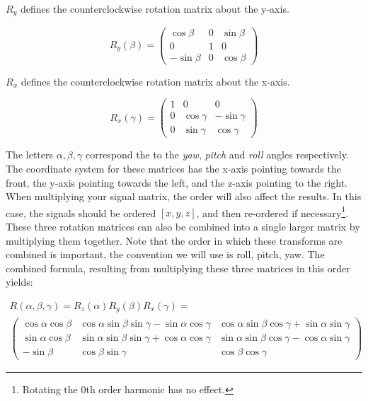 $R_y$ defines the counterclockwise rotation matrix about the y-axis.

\begin{equation}
R_{y}(\beta)=\left(\begin{array}{ccc}
\cos \beta & 0 & \sin \beta \\
0 & 1 & 0 \\
-\sin \beta & 0 & \cos \beta
\end{array}\right)
\end{equation}

$R_x$ defines the counterclockwise rotation matrix about the x-axis.

\begin{equation}
R_{x}(\gamma)=\left(\begin{array}{ccc}
1 & 0 & 0 \\
0 & \cos \gamma & -\sin \gamma \\
0 & \sin \gamma & \cos \gamma
\end{array}\right)
\end{equation}

The letters $\alpha, \beta, \gamma$ correspond the to the \textit{yaw}, \textit{pitch} and \textit{roll} angles respectively. The coordinate system for these matrices has the x-axis pointing towards the front, the y-axis pointing towards the left, and the z-axis pointing to the right. When multiplying your signal matrix, the order will also affect the results. In this case, the signals should be ordered $[x, y, z]$, and then re-ordered if necessary\footnote{Rotating the 0th order harmonic has no effect.}. These three rotation matrices can also be combined into a single larger matrix by multiplying them together. Note that the order in which these transforms are combined is important, the convention we will use is roll, pitch, yaw. The combined formula, resulting from multiplying these three matrices in this order yields:

\begin{equation}
\begin{array}{l}
R(\alpha, \beta, \gamma)=R_{z}(\alpha) R_{y}(\beta) R_{x}(\gamma)= \\
\left(\begin{array}{ccc}
\cos \alpha \cos \beta & \cos \alpha \sin \beta \sin \gamma-\sin \alpha \cos \gamma & \cos \alpha \sin \beta \cos \gamma+\sin \alpha \sin \gamma \\
\sin \alpha \cos \beta & \sin \alpha \sin \beta \sin \gamma+\cos \alpha \cos \gamma & \sin \alpha \sin \beta \cos \gamma-\cos \alpha \sin \gamma \\
-\sin \beta & \cos \beta \sin \gamma & \cos \beta \cos \gamma
\end{array}\right)
\end{array}
\end{equation}

